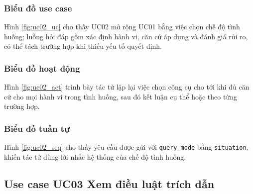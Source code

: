 \documentclass[../DoAn.tex]{subfiles}
\begin{document}
\subsubsection{Biểu đồ use case}
Hình \ref{fig:uc02_uc} cho thấy UC02 mở rộng UC01 bằng việc chọn chế độ tình huống; luồng hỏi đáp gồm xác định hành vi, căn cứ áp dụng và đánh giá rủi ro, có thể tách trường hợp khi thiếu yếu tố quyết định.


\subsubsection{Biểu đồ hoạt động}
Hình \ref{fig:uc02_act} trình bày tác tử lặp lại việc chọn công cụ cho tới khi đủ căn cứ cho mọi hành vi trong tình huống, sau đó kết luận cụ thể hoặc theo từng trường hợp.


\subsubsection{Biểu đồ tuần tự}
Hình \ref{fig:uc02_seq} cho thấy yêu cầu được gửi với \texttt{query\_mode} bằng \texttt{situation}, khiến tác tử dùng lời nhắc hệ thống của chế độ tình huống.



\subsection{Use case UC03 Xem điều luật trích dẫn}
\label{subsection:uc03}
\end{document}
